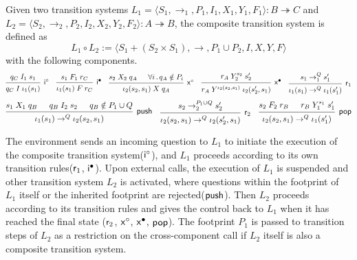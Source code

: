 \documentclass[sigplan,10pt,authordraft]{acmart}
\begin{document}
\begin{definition} \label{def:lts-comp}
Given two transition systems
$L_1 = \langle S_1, {\rightarrow_1}, P_1, I_1, X_1, Y_1, F_1 \rangle
: B \twoheadrightarrow C$ and
$L_2 = \langle S_2, {\rightarrow_2}, P_2, I_2, X_2, Y_2, F_2 \rangle
: A \twoheadrightarrow B$,
the composite transition system is defined as
\[
  L_1 \circ L_2 :=
  \langle S_1 + (S_2 \times S_1), {\rightarrow}, P_1 \cup P_2, I, X, Y, F \rangle
\]
with the following components.
\[
  \begin{prooftree}
    \hypo{q_C \mathrel{I_1} s_1}
    \infer1[$\kw{i}^\circ$]{q_C \mathrel{I} \iota_1(s_1)}
  \end{prooftree}
  \quad
  \begin{prooftree}
    \hypo{s_1 \mathrel{F_1} r_C}
    \infer1[$\kw{i}^\bullet$]{\iota_1(s_1) \mathrel{F} r_C}
  \end{prooftree}
  \quad
  \begin{prooftree}
    \hypo{s_2 \mathrel{X_2} q_A}
    \hypo{\forall i\,.\, q_A \notin P_i}
    \infer2[$\kw{x}^\circ$]{\iota_2(s_2, s_1) \mathrel{X} q_A}
  \end{prooftree}
  \quad
  \begin{prooftree}
    \hypo{r_A \mathrel{Y_2^{s_2}} s_2'}
    \infer1[$\kw{x}^\bullet$]{r_A \mathrel{Y^{\iota_2(s_2, s_1)}} \iota_2(s_2', s_1)}
  \end{prooftree}
  \quad
  \begin{prooftree}
    \hypo{s_1 \rightarrow_1^Q s_1'}
    \infer1[$\kw{r}_1$]{\iota_1(s_1) \rightarrow^Q \iota_1(s_1')}
  \end{prooftree}
\]
\[
  \begin{prooftree}
    \hypo{s_1 \mathrel{X_1} q_B}
    \hypo{q_B \mathrel{I_2} s_2}
    \hypo{q_B \notin P_1 \cup Q}
    \infer3[\kw{push}]{\iota_1(s_1) \rightarrow^Q \iota_2(s_2, s_1)}
  \end{prooftree}
  \quad
  \begin{prooftree}
    \hypo{s_2 \rightarrow_2^{P_1 \cup Q} s_2'}
    \infer1[$\kw{r}_2$]{\iota_2(s_2, s_1) \rightarrow^Q \iota_2(s_2', s_1)}
  \end{prooftree}
  \quad
  \begin{prooftree}
    \hypo{s_2 \mathrel{F_2} r_B}
    \hypo{r_B \mathrel{Y_1^{s_1}} s_1'}
    \infer2[\kw{pop}]{\iota_2(s_2, s_1) \rightarrow^Q \iota_1(s_1')}
  \end{prooftree}
\]
\end{definition}
The environment sends an incoming question to $L_1$ to initiate the execution of
the composite transition system($ \mathsf{i} ^\circ$), and $L_1$ proceeds according to
its own transition rules($ \mathsf{r} _1$, $ \mathsf{i} ^\bullet$). Upon external calls, the
execution of $L_1$ is suspended and other transition system $L_2$ is activated,
where questions within the footprint of $L_1$ itself or the inherited footprint
are rejected($ \mathsf{push} $). Then $L_2$ proceeds according to its transition rules
and gives the control back to $L_1$ when it has reached the final state
($ \mathsf{r} _2$, $ \mathsf{x} ^\circ$, $ \mathsf{x} ^\bullet$, $ \mathsf{pop} $). The footprint $P_1$
is passed to transition steps of $L_2$ as a restriction on the cross-component
call if $L_2$ itself is also a composite transition system.
\end{document}

